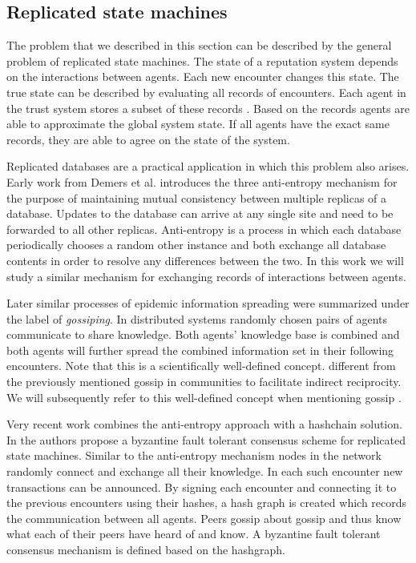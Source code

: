 \subsection{Replicated state machines}
The problem that we described in this section can be described by the general problem of replicated 
state machines. The state of a reputation system depends on the interactions between agents. Each 
new encounter changes this state. The true state can be described by evaluating all records of 
encounters. Each agent in the trust system stores a subset of these records . Based on the records
agents are able to approximate the global system state. If all agents have the exact same records, 
they are able to agree on the state of the system. 

Replicated databases are a practical application in which this problem also arises. Early work from
Demers et al.\cite{demers1987epidemic} introduces the three anti-entropy mechanism
for the purpose of maintaining mutual consistency between multiple replicas of a database. Updates
to the database can arrive at any single site and need to be forwarded to all other replicas. 
Anti-entropy is a process in which each database periodically 
chooses a random other instance and both exchange all database contents in order to resolve any 
differences between the two. In this work we will study a similar mechanism for exchanging records
of interactions between agents. 

Later similar processes of epidemic information spreading were summarized under the label of 
\textit{gossiping}. In distributed systems randomly chosen pairs of agents communicate to share 
knowledge. Both agents' knowledge base is combined and both agents will further spread the combined
information set in their following encounters. Note that this is a scientifically well-defined 
concept. different from the previously mentioned gossip in communities to facilitate indirect reciprocity.
We will subsequently refer to this well-defined concept when mentioning gossip \cite{hedetniemi1988survey}.

Very recent work combines the anti-entropy approach with a hashchain solution. In \cite{baird2016swirlds}
the authors propose a byzantine fault tolerant consensus scheme for replicated state machines. Similar
to the anti-entropy mechanism nodes in the network randomly connect and exchange all their knowledge. In each
such encounter new transactions can be announced. By signing each encounter and connecting it to the
previous encounters using their hashes, a hash graph is created which records the communication 
between all agents. Peers gossip about gossip and thus know what each of their peers have heard of and
know. A byzantine fault tolerant consensus mechanism is defined based on the hashgraph.


